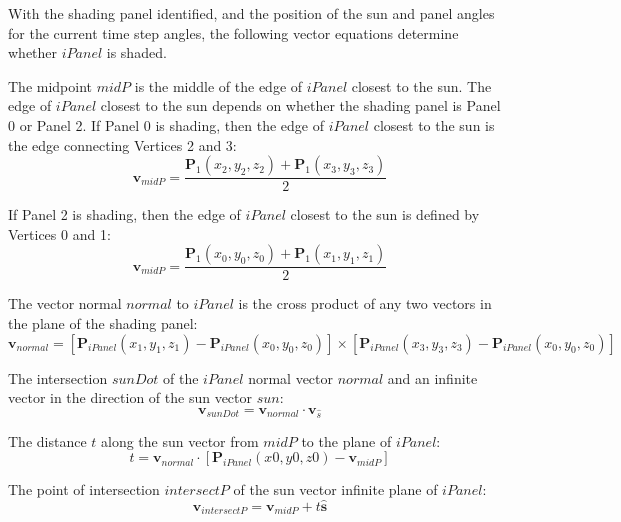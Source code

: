 \documentclass[12pt,letterpaper]{article}
\begin{document}
With the shading panel identified, and the position of the sun and panel angles for the current time step angles, the following vector equations determine whether $\mathit{iPanel}$ is shaded.

The midpoint $\mathit{midP}$ is the middle of the edge of $\mathit{iPanel}$ closest to the sun. The edge of $\mathit{iPanel}$ closest to the sun depends on whether the shading panel is Panel 0 or Panel 2. If Panel 0 is shading, then the edge of $\mathit{iPanel}$ closest to the sun is the edge connecting Vertices 2 and 3:
\begin{equation}
\mathbf{v}_{midP} = \frac{\mathbf{P}_{1}(x_2,y_2,z_2) + \mathbf{P}_{1}(x_3,y_3,z_3)}{2}
\end{equation}

If Panel 2 is shading, then the edge of $\mathit{iPanel}$ closest to the sun is defined by Vertices 0 and 1:
\begin{equation}
\mathbf{v}_{midP} = \frac{\mathbf{P}_{1}(x_0,y_0,z_0) + \mathbf{P}_{1}(x_1,y_1,z_1)}{2}
\end{equation}

The vector normal  $\mathit{normal}$ to $\mathit{iPanel}$ is the cross product of any two vectors in the plane of the shading panel:
\begin{equation}
\mathbf{v}_{normal} = \left[\mathbf{P}_{iPanel}(x_1,y_1,z_1)-\mathbf{P}_{iPanel}(x_0,y_0,z_0)\right]\times\left[\mathbf{P}_{iPanel}(x_3,y_3,z_3)-\mathbf{P}_{iPanel}(x_0,y_0,z_0)\right]
\end{equation}

The intersection $\mathit{sunDot}$ of the $\mathit{iPanel}$ normal vector $\mathit{normal}$ and an infinite vector in the direction of the sun vector $\mathit{sun}$:
\begin{equation}\label{eqn_sunDot}
\mathbf{v}_{sunDot}=\mathbf{v}_{normal}\cdot\mathbf{v}_{\hat s}
\end{equation}


The distance $\mathit{t}$ along the sun vector from $\mathit{midP}$ to the plane of $\mathit{iPanel}$:
\begin{equation}
t=\mathbf{v}_{normal}\cdot[\mathbf{P}_{iPanel}(x0,y0,z0)-\mathbf{v}_{midP}]
\end{equation}

The point of intersection $\mathit{intersectP}$ of the sun vector infinite plane of  $\mathit{iPanel}$:
\begin{equation}
\mathbf{v}_{intersectP}=\mathbf{v}_{midP}+t\mathbf{\hat s}
\end{equation}
\end{document}
